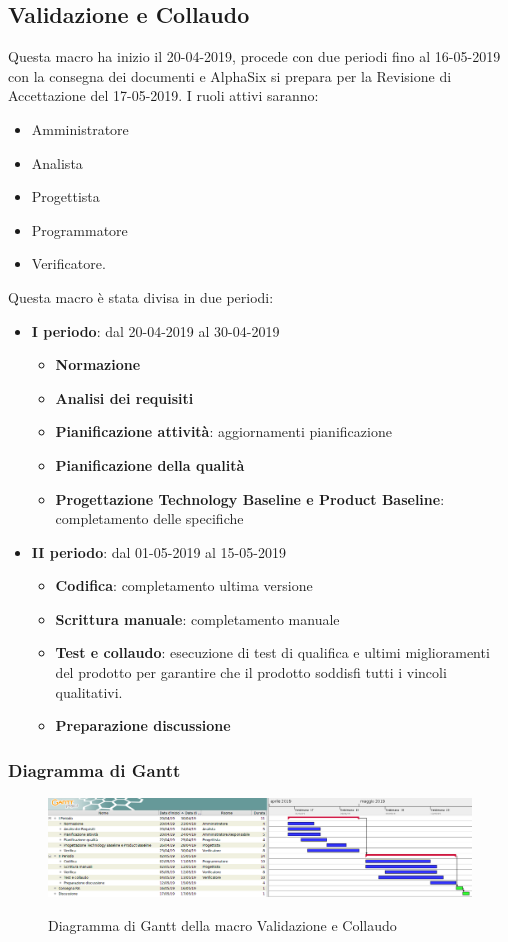         \subsection{Validazione e Collaudo}
        Questa macro ha inizio il 20-04-2019, procede con due periodi fino al 16-05-2019 con la consegna dei documenti e AlphaSix si
        prepara per la Revisione di Accettazione del 17-05-2019. I ruoli attivi saranno: 
        \begin{itemize}
            \item Amministratore
            \item Analista
            \item Progettista
            \item Programmatore
            \item Verificatore.
        \end{itemize}
        Questa macro è stata divisa in due periodi:
		\begin{itemize}
			\item \textbf{I periodo}: dal 20-04-2019 al 30-04-2019
			\begin{itemize}
    	        \item \textbf{Normazione}
    	        \item \textbf{Analisi dei requisiti}
    	        \item \textbf{Pianificazione attività}: aggiornamenti pianificazione
    	        \item \textbf{Pianificazione della qualità}
    	        \item \textbf{Progettazione Technology Baseline e Product Baseline}: completamento delle specifiche
        	\end{itemize}
			\item \textbf{II periodo}: dal 01-05-2019 al 15-05-2019
			\begin{itemize}
    	        \item \textbf{Codifica}: completamento ultima versione
    	        \item \textbf{Scrittura manuale}: completamento manuale
    	        \item \textbf{Test e collaudo}: esecuzione di test di qualifica e ultimi miglioramenti del prodotto per
    	        garantire che il prodotto soddisfi tutti i vincoli qualitativi.
    	        \item \textbf{Preparazione discussione}
        	\end{itemize}
		\end{itemize}
        
        \begin{landscape}
			\subsubsection{Diagramma di Gantt}        
			\begin{figure}[H]
					\centering
					\includegraphics[scale=0.44]{img/Validazione_e_collaudo.png}\\
					\caption{Diagramma di Gantt della macro Validazione e Collaudo}
			\end{figure}
		\end{landscape}
		\newpage

